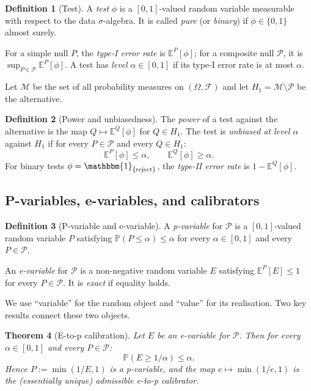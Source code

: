\documentclass[11pt,a4paper,twocolumn]{article}
\theoremstyle{plain}
\newtheorem{theorem}{Theorem}[section]
\theoremstyle{definition}
\newtheorem{definition}[theorem]{Definition}
\theoremstyle{remark}
\newcommand{\E}{\mathbb{E}}
\newcommand{\Prob}{\mathbb{P}}
\newcommand{\ind}{\mathbbm{1}}
\begin{document}
\begin{definition}[Test]
A \emph{test} $\phi$ is a $[0,1]$-valued random variable measurable with
respect to the data $\sigma$-algebra. It is called \emph{pure} (or
\emph{binary}) if $\phi \in \{0,1\}$ almost surely.

For a simple null $P$, the \emph{type-I error rate} is $\E^P[\phi]$; for a
composite null $\mathcal{P}$, it is $\sup_{P \in \mathcal{P}} \E^P[\phi]$. A
test has \emph{level} $\alpha \in [0,1]$ if its type-I error rate is at most
$\alpha$.
\end{definition}

Let $\mathcal{M}$ be the set of all probability measures on $(\Omega,
\mathcal{F})$ and let $H_1 = \mathcal{M} \setminus \mathcal{P}$ be the
alternative.

\begin{definition}[Power and unbiasedness]
The \emph{power} of a test against the alternative is the map $Q \mapsto
\E^Q[\phi]$ for $Q \in H_1$. The test is \emph{unbiased at level $\alpha$}
against $H_1$ if for every $P \in \mathcal{P}$ and every $Q \in H_1$:
\[
  \E^P[\phi] \leq \alpha, \qquad \E^Q[\phi] \geq \alpha.
\]
For binary tests $\phi = \ind_{\{\text{reject}\}}$, the \emph{type-II error
rate} is $1 - \E^Q[\phi]$.
\end{definition}

\subsection{P-variables, e-variables, and calibrators}
\label{sec:pe}

\begin{definition}[P-variable and e-variable]
A \emph{p-variable} for $\mathcal{P}$ is a $[0,1]$-valued random variable $P$
satisfying $\Prob(P \le \alpha) \le \alpha$ for every $\alpha \in [0,1]$ and
every $P \in \mathcal{P}$.

An \emph{e-variable} for $\mathcal{P}$ is a non-negative random variable $E$
satisfying $\E^P[E] \le 1$ for every $P \in \mathcal{P}$. It is \emph{exact}
if equality holds.
\end{definition}

We use ``variable'' for the random object and ``value'' for its realisation.
Two key results connect these two objects.

\begin{theorem}[E-to-p calibration]
Let $E$ be an e-variable for $\mathcal{P}$. Then for every $\alpha \in [0,1]$
and every $P \in \mathcal{P}$:
\[
  \Prob\!\left(E \geq 1/\alpha\right) \leq \alpha.
\]
Hence $P := \min(1/E, 1)$ is a p-variable, and the map $e \mapsto \min(1/e, 1)$
is the (essentially unique) admissible e-to-p calibrator.
\end{theorem}
\end{document}
